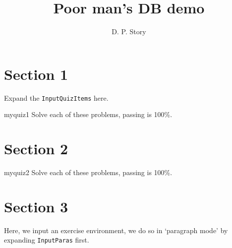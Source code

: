 \documentclass{article}
\title{Poor man's DB demo}
\author{D. P. Story}
\def\cs#1{\texttt{\eqbs#1}}
\begin{document}
\maketitle
\tableofcontents

\section{Section 1}

Expand the \cs{InputQuizItems} here.

\begin{quiz*}{myquiz1}
Solve each of these problems, passing is 100\%.
\begin{questions}




\end{questions}
\end{quiz*}

\section{Section 2}



\begin{quiz*}{myquiz2}
Solve each of these problems, passing is 100\%.
\begin{questions}




\end{questions}
\end{quiz*} %

\section{Section 3}

Here, we input an \textsf{exercise} environment, we do so in `paragraph mode' by expanding
\cs{InputParas} first.

\InputParas

\end{document}

